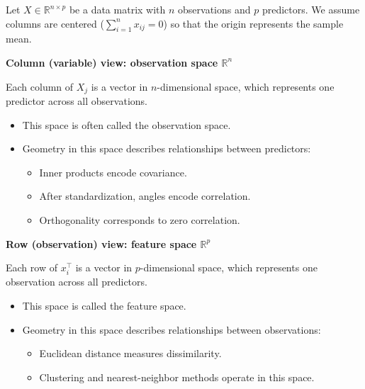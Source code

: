 \documentclass[
  letterpaper,
  DIV=11,
  numbers=noendperiod]{scrreprt}
\providecommand{\tightlist}{%
  \setlength{\itemsep}{0pt}\setlength{\parskip}{0pt}}
\theoremstyle{definition}
\theoremstyle{definition}
\theoremstyle{plain}
\theoremstyle{plain}
\theoremstyle{remark}
\begin{document}
Let \(X \in \mathbb{R}^{n \times p}\) be a data matrix with \(n\)
observations and \(p\) predictors. We assume columns are centered
(\(\sum_{i=1}^n x_{ij} = 0\)) so that the origin represents the sample
mean.

\textbf{Column (variable) view: observation space \(\mathbb{R}^n\)}

Each column of \(X_j\) is a vector in \(n\)-dimensional space, which
represents one predictor across all observations.

\begin{itemize}
\tightlist
\item
  This space is often called the observation space.
\item
  Geometry in this space describes relationships between predictors:

  \begin{itemize}
  \tightlist
  \item
    Inner products encode covariance.
  \item
    After standardization, angles encode correlation.
  \item
    Orthogonality corresponds to zero correlation.
  \end{itemize}
\end{itemize}

\textbf{Row (observation) view: feature space \(\mathbb{R}^p\)}

Each row of \(x_i^\top\) is a vector in \(p\)-dimensional space, which
represents one observation across all predictors.

\begin{itemize}
\tightlist
\item
  This space is called the feature space.
\item
  Geometry in this space describes relationships between observations:

  \begin{itemize}
  \tightlist
  \item
    Euclidean distance measures dissimilarity.
  \item
    Clustering and nearest-neighbor methods operate in this space.
  \end{itemize}
\end{itemize}
\end{document}
